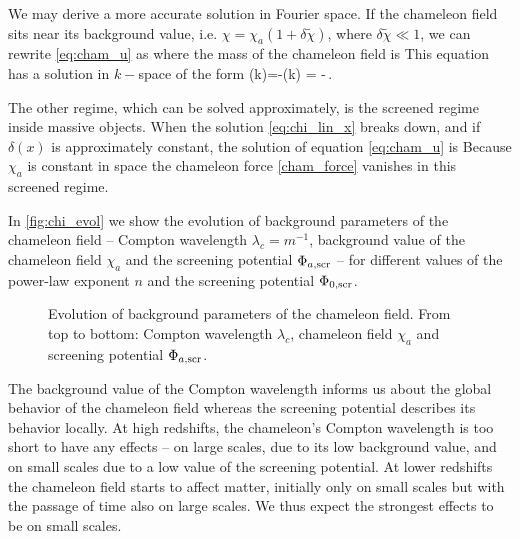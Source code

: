 We may derive a more accurate solution in Fourier space. If the chameleon field sits near its background value, i.e. $\chi=\chi_a\left(1 + \delta\tilde\chi \right)$, where $\delta\tilde\chi \ll 1$, we can rewrite \eqref{eq:cham_u} as
where the mass of the chameleon field is
This equation has a solution in $k-$space of the form
\eq
{
\label{eq:chi_lin_k}
	\hat{\chi}(k)=-\hat{\delta}(k) = -\frac{\beta\bar\rho}{\Mpl}\,.
}

The other regime, which can be solved approximately, is the screened regime inside massive objects. When the solution \eqref{eq:chi_lin_x} breaks down, and if $\delta(x)$ is approximately constant, the solution of equation \eqref{eq:cham_u} is
Because $\chi_a$ is constant in space the chameleon force \eqref{cham_force} vanishes in this screened regime.

In \autoref{fig:chi_evol} we show the evolution of background parameters of the chameleon field -- Compton wavelength $\lambda_c=m^{-1}$, background value of the chameleon field $\chi_a$ and the screening potential $\Phi_{a,\text{\scriptsize scr}}$ -- for different values of the power-law exponent $n$ and the screening potential $\Phi_{0,\text{\scriptsize scr}}$.

\begin{figure}[hbt]
\centering
	\begin{subfigure}{1.0\textwidth}
	\end{subfigure}
	\begin{subfigure}{1.0\textwidth}
	\end{subfigure}
    \caption{Evolution of background parameters of the chameleon field. From top to bottom: Compton wavelength $\lambda_c$, chameleon field $\chi_a$ and screening potential $\Phi_{a,\text{\scriptsize scr}}$.}
    \label{fig:chi_evol}
\end{figure}

The background value of the Compton wavelength informs us about the global behavior of the chameleon field whereas the screening potential describes its behavior locally. At high redshifts, the chameleon's Compton wavelength is too short to have any effects -- on large scales, due to its low background value, and on small scales due to a low value of the screening potential. At lower redshifts the chameleon field starts to affect matter, initially only on small scales but with the passage of time also on large scales. We thus expect the strongest effects to be on small scales.
